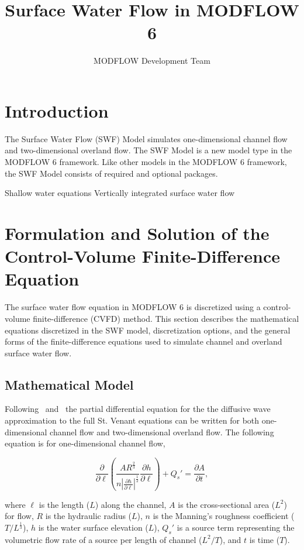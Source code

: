 \documentclass[fleqn]{article}
\author{MODFLOW Development Team}
\begin{document}
\title{Surface Water Flow in MODFLOW 6}
\maketitle

\tableofcontents

\section{Introduction}
The Surface Water Flow (SWF) Model simulates one-dimensional channel flow and two-dimensional overland flow.  The SWF Model is a new model type in the MODFLOW 6 framework.  Like other models in the MODFLOW 6 framework, the SWF Model consists of required and optional packages.

Shallow water equations
Vertically integrated surface water flow

\section{Formulation and Solution of the Control-Volume Finite-Difference Equation}

The surface water flow equation in MODFLOW 6 is discretized using a control-volume finite-difference (CVFD) method. This section describes the mathematical equations discretized in the SWF model, discretization options, and the general forms of the finite-difference equations used to simulate channel and overland surface water flow.

\subsection{Mathematical Model}
Following~\cite{panday2004} and~\cite{hughes2012documentation} the partial differential equation for the the diffusive wave approximation to the full St. Venant equations can be written for both one-dimensional channel flow and two-dimensional overland flow.  The following equation is for one-dimensional channel flow,

\begin{equation}
  \frac{\partial}{\partial \ell}
  \left (
  \frac{A R^{\frac{2}{3}}}{n \left | \frac{\partial h}{\partial \ell} \right |^{\frac{1}{2}} } \frac{\partial h}{\partial \ell}
  \right )
  + Q_s'
  =   
  \frac{\partial A}{\partial t},
\label{eqn:onedpd}
\end{equation}

\noindent where $\ell$ is the length ($L$) along the channel, $A$ is the cross-sectional area  ($L^2$) for flow, $R$ is the hydraulic radius ($L$), $n$ is the Manning's roughness coefficient ($T/L^{\frac{1}{3}}$), $h$ is the water surface elevation ($L$), $Q_s'$ is a source term representing the volumetric flow rate of a source per length of channel ($L^2/T$), and $t$ is time ($T$). 
\end{document}
